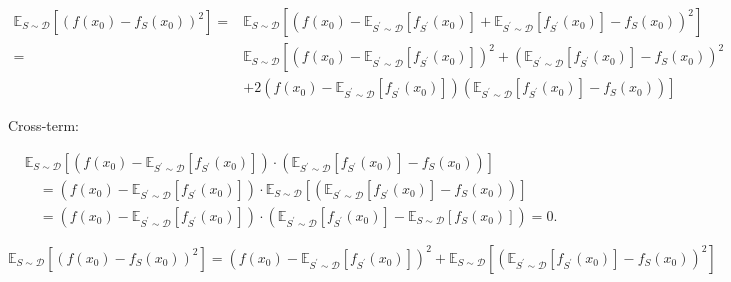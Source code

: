 \documentclass[10pt]{article}
\begin{document}
$$
\begin{aligned}
\mathbb{E}_{S \sim \mathscr{D}}\left[\left(f\left(x_{0}\right)-f_{S}\left(x_{0}\right)\right)^{2}\right]= & \mathbb{E}_{S \sim \mathscr{D}}\left[\left(f\left(x_{0}\right)-\mathbb{E}_{S^{\prime} \sim \mathscr{D}}\left[f_{S^{\prime}}\left(x_{0}\right)\right]+\mathbb{E}_{S^{\prime} \sim \mathscr{D}}\left[f_{S^{\prime}}\left(x_{0}\right)\right]-f_{S}\left(x_{0}\right)\right)^{2}\right] \\
= & \mathbb{E}_{S \sim \mathscr{D}}\left[\left(f\left(x_{0}\right)-\mathbb{E}_{S^{\prime} \sim \mathcal{D}}\left[f_{S^{\prime}}\left(x_{0}\right)\right]\right)^{2}+\left(\mathbb{E}_{S^{\prime} \sim \mathscr{D}}\left[f_{S^{\prime}}\left(x_{0}\right)\right]-f_{S}\left(x_{0}\right)\right)^{2}\right. \\
& \left.+2\left(f\left(x_{0}\right)-\mathbb{E}_{S^{\prime} \sim \mathscr{D}}\left[f_{S^{\prime}}\left(x_{0}\right)\right]\right)\left(\mathbb{E}_{S^{\prime} \sim \mathscr{D}}\left[f_{S^{\prime}}\left(x_{0}\right)\right]-f_{S}\left(x_{0}\right)\right)\right]
\end{aligned}
$$

Cross-term:

$$
\begin{aligned}
& \mathbb{E}_{S \sim \mathscr{D}} {\left[\left(f\left(x_{0}\right)-\mathbb{E}_{S^{\prime} \sim \mathscr{D}}\left[f_{S^{\prime}}\left(x_{0}\right)\right]\right) \cdot\left(\mathbb{E}_{S^{\prime} \sim \mathscr{D}}\left[f_{S^{\prime}}\left(x_{0}\right)\right]-f_{S}\left(x_{0}\right)\right)\right] } \\
& \quad=\left(f\left(x_{0}\right)-\mathbb{E}_{S^{\prime} \sim \mathscr{D}}\left[f_{S^{\prime}}\left(x_{0}\right)\right]\right) \cdot \mathbb{E}_{S \sim \mathscr{D}}\left[\left(\mathbb{E}_{S^{\prime} \sim \mathscr{D}}\left[f_{S^{\prime}}\left(x_{0}\right)\right]-f_{S}\left(x_{0}\right)\right)\right] \\
& \quad=\left(f\left(x_{0}\right)-\mathbb{E}_{S^{\prime} \sim \mathscr{D}}\left[f_{S^{\prime}}\left(x_{0}\right)\right]\right) \cdot\left(\mathbb{E}_{S^{\prime} \sim \mathcal{D}}\left[f_{S^{\prime}}\left(x_{0}\right)\right]-\mathbb{E}_{S \sim \mathscr{D}}\left[f_{S}\left(x_{0}\right)\right]\right)=0 .
\end{aligned}
$$

$$
\mathbb{E}_{S \sim \mathscr{D}}\left[\left(f\left(x_{0}\right)-f_{S}\left(x_{0}\right)\right)^{2}\right]=\left(f\left(x_{0}\right)-\mathbb{E}_{S^{\prime} \sim \mathscr{D}}\left[f_{S^{\prime}}\left(x_{0}\right)\right]\right)^{2}+\mathbb{E}_{S \sim \mathscr{D}}\left[\left(\mathbb{E}_{S^{\prime} \sim \mathscr{D}}\left[f_{S^{\prime}}\left(x_{0}\right)\right]-f_{S}\left(x_{0}\right)\right)^{2}\right]
$$
\end{document}
